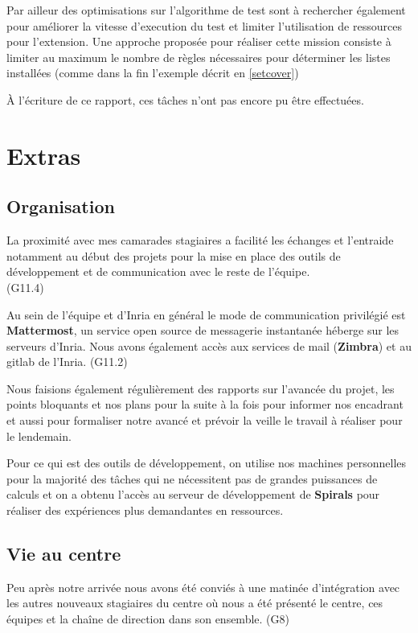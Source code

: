 \documentclass[oneside,a4paper,12pt]{article}
\begin{document}
Par ailleur des optimisations sur l'algorithme de test sont à rechercher également pour améliorer la vitesse d'execution du test et limiter l'utilisation de ressources pour l'extension. Une approche proposée pour réaliser cette mission consiste à limiter au maximum le nombre de règles nécessaires pour déterminer les listes installées (comme dans la fin l'exemple décrit en \ref{setcover})

\`A l'écriture de ce rapport, ces tâches n'ont pas encore pu être effectuées.

\newpage
\section{Extras}

\subsection{Organisation}

La proximité avec mes camarades stagiaires a facilité les échanges et l'entraide notamment au début des projets pour la mise en place des outils de développement et de communication avec le reste de l'équipe.\\ (G11.4)

Au sein de l'équipe et d'Inria en général le mode de communication privilégié est \textbf{Mattermost}, un service open source de messagerie instantanée héberge sur les serveurs d'Inria. Nous avons également accès aux services de mail (\textbf{Zimbra}) et au gitlab de l'Inria. (G11.2)

Nous faisions également régulièrement des rapports sur l'avancée du projet, les points bloquants et nos plans pour la suite à la fois pour informer nos encadrant et aussi pour formaliser notre avancé et prévoir la veille le travail à réaliser pour le lendemain.

Pour ce qui est des outils de développement, on utilise nos machines personnelles pour la majorité des tâches qui ne nécessitent pas de grandes puissances de calculs et on a obtenu l'accès au serveur de développement de \textbf{Spirals} pour réaliser des expériences plus demandantes en ressources.

\subsection{Vie au centre}

Peu après notre arrivée nous avons été conviés à une matinée d'intégration avec les autres nouveaux stagiaires du centre où nous a été présenté le centre, ces équipes et la chaîne de direction dans son ensemble. (G8)
\end{document}
